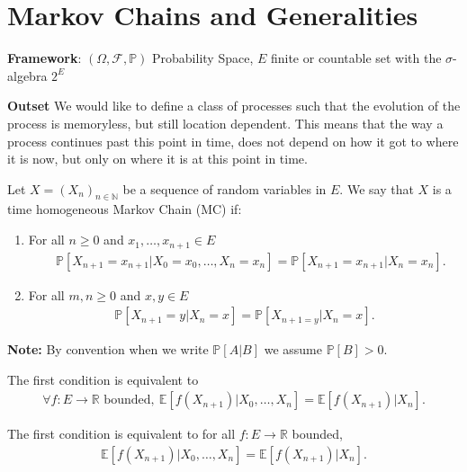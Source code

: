 \chapter{Markov Chains and Generalities}

\textbf{Framework}: $(\Omega, \mathcal{F}, \mathbb{P})$ Probability Space, $E$ finite or countable set with the $\sigma$-algebra $2^E$

\noindent
\textbf{Outset} We would like to define a class of processes such that the evolution of the process is memoryless, but still location dependent. This means that the way a process continues past this point in time, does not depend on how it got to where it is now, but only on where it is at this point in time. 

\begin{defn}
	Let $X=(X_n)_{n \in \mathbb{N}}$ be a sequence of random variables in $E$. We say that $X$ is a time homogeneous Markov Chain (MC) if:
\begin{enumerate}
	\item  For all $n \geq 0$ and $x_1,\ldots,x_{n+1} \in E$
\begin{align}
	\quad \boxed{\mathbb{P} \left[ X_{n+1}=x_{n+1} | X_0=x_0,\ldots,X_n=x_n \right] = \mathbb{P} \left[ X_{n+1}=x_{n+1} | X_n = x_n \right].}
\end{align}
	\item For all $m,n \geq 0$ and $x,y \in E$
\begin{align}	
	\boxed{\mathbb{P} \left[ X_{n+1}=y | X_{n}=x \right] = \mathbb{P} \left[ X_{n+1=y}| X_n=x \right].} 
\end{align}
\end{enumerate}

\end{defn}

\textbf{Note:} By convention when we write $\mathbb{P} \left[ A|B \right] $ we assume $\mathbb{P} \left[ B \right] >0$.

\begin{rmk}
The first condition is equivalent to
\begin{align}
	\forall f:E\to \mathbb{R}\textrm{ bounded},\ \mathbb{E} \left[ f(X_{n+1}) | X_0,\ldots,X_n \right] = \mathbb{E} \left[ f(X_{n+1}) | X_n \right] 
.\end{align}

\end{rmk}
{\color{blue}
\begin{rmk}
The first condition is equivalent to for all $f: E\to \mathbb{R}$ bounded,
\begin{align}
	\boxed{\mathbb{E} \left[ f(X_{n+1}) | X_0,\ldots,X_n \right] = \mathbb{E} \left[ f(X_{n+1}) | X_n \right].} 
\end{align}

\end{rmk}
}

